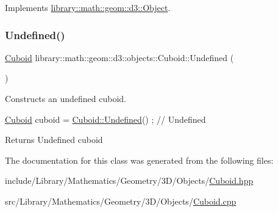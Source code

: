 Implements \hyperlink{classlibrary_1_1math_1_1geom_1_1d3_1_1_object_aa166f4ce4d116a248f0fc861c75012ca}{library\+::math\+::geom\+::d3\+::\+Object}.

\mbox{\label{classlibrary_1_1math_1_1geom_1_1d3_1_1objects_1_1_cuboid_ae87cb41a6038e58e17553daa8270abab}} 
\subsubsection{\texorpdfstring{Undefined()}{Undefined()}}
{\footnotesize\ttfamily \hyperlink{classlibrary_1_1math_1_1geom_1_1d3_1_1objects_1_1_cuboid}{Cuboid} library\+::math\+::geom\+::d3\+::objects\+::\+Cuboid\+::\+Undefined (\begin{DoxyParamCaption}{ }\end{DoxyParamCaption})\hspace{0.3cm}{\ttfamily [static]}}



Constructs an undefined cuboid. 


\begin{DoxyCode}
\hyperlink{classlibrary_1_1math_1_1geom_1_1d3_1_1objects_1_1_cuboid_ac42299f962fab284a76a46d4ea4e6fa2}{Cuboid} cuboid = \hyperlink{classlibrary_1_1math_1_1geom_1_1d3_1_1objects_1_1_cuboid_ae87cb41a6038e58e17553daa8270abab}{Cuboid::Undefined}() ; \textcolor{comment}{// Undefined}
\end{DoxyCode}


\begin{DoxyReturn}{Returns}
Undefined cuboid 
\end{DoxyReturn}


The documentation for this class was generated from the following files\+:\begin{DoxyCompactItemize}
\item 
include/\+Library/\+Mathematics/\+Geometry/3\+D/\+Objects/\hyperlink{_cuboid_8hpp}{Cuboid.\+hpp}\item 
src/\+Library/\+Mathematics/\+Geometry/3\+D/\+Objects/\hyperlink{_cuboid_8cpp}{Cuboid.\+cpp}\end{DoxyCompactItemize}
